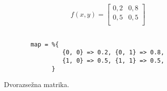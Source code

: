 \begin{figure}
\centering
\begin{subfigure}{.42\textwidth}
  \centering
  $$
  f(x, y) = 
   \begin{bmatrix}
    0,2 & 0,8 \\
    0,5 & 0,5 \\
   \end{bmatrix}
  $$
\end{subfigure}%
\begin{subfigure}{.58\textwidth}
  \centering
  \footnotesize
  \vspace{\baselineskip}
  \begin{verbatim}
  
  map = %{
           {0, 0} => 0.2, {0, 1} => 0.8,
           {1, 0} => 0.5, {1, 1} => 0.5,
        }
  \end{verbatim}
\end{subfigure}
\caption{Dvorazsežna matrika.}
\label{fig:impl:matrix_as_map}
\end{figure}
